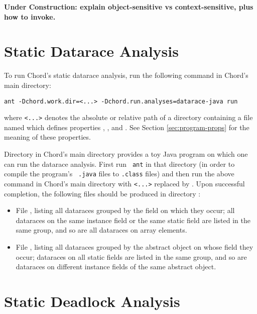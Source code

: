 {\bf Under Construction: explain object-sensitive vs context-sensitive, plus how to invoke.}

\section{Static Datarace Analysis}

To run Chord's static datarace analysis, run the following
command in Chord's main directory:

\begin{framed}
\begin{verbatim}
ant -Dchord.work.dir=<...> -Dchord.run.analyses=datarace-java run
\end{verbatim}
\end{framed}

where {\tt <...>} denotes the absolute or relative path of a directory
containing a file named  which defines
properties , , and
.  See Section \ref{sec:program-props} for the
meaning of these properties.

Directory  in Chord's main directory provides a toy Java
program on which one can run the datarace analysis.  First run {\tt
  ant} in that directory (in order to compile the program's {\tt
  .java} files to {\tt .class} files) and then run the above command
in Chord's main directory with {\tt <...>} replaced by
.  Upon successful completion, the
following files should be produced in directory
:

\begin{itemize}
\item
File , listing all dataraces grouped by
the field on which they occur; all dataraces on the same instance
field or the same static field are listed in the same group, and so
are all dataraces on array elements.
\item
File , listing all dataraces grouped by
the abstract object on whose field they occur; dataraces on all static
fields are listed in the same group, and so are dataraces on different
instance fields of the same abstract object.
\end{itemize}

\section{Static Deadlock Analysis}

